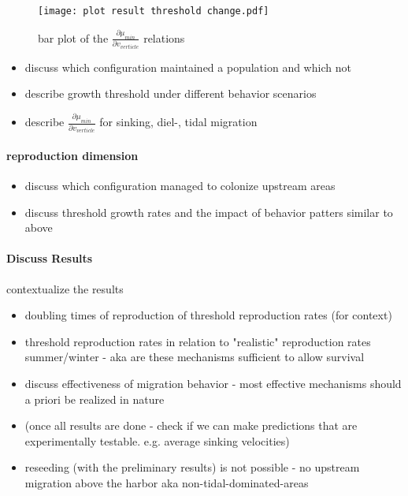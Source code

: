 \begin{figure}
    \texttt{[image: plot result threshold change.pdf]}
    \caption{bar plot of the $\frac{\partial \mu_{min}}{\partial v_{verticle}}$ relations}
    \label{fig:retention_results_dmu}
\end{figure}

\begin{itemize}
    \item discuss which configuration maintained a population and which not
    \item describe growth threshold under different behavior scenarios
    \item describe $\frac{\partial \mu_{min}}{\partial v_{verticle}}$ for sinking, diel-, tidal migration
\end{itemize}

\paragraph{reproduction dimension}
\begin{itemize}
    \item discuss which configuration managed to colonize upstream areas
    \item discuss threshold growth rates and the impact of behavior patters similar to above
\end{itemize}

\paragraph{Discuss Results}
contextualize the results 
\begin{itemize}
    \item doubling times of reproduction of threshold reproduction rates (for context)
    \item threshold reproduction rates in relation to "realistic" reproduction rates summer/winter - aka are these mechanisms sufficient to allow survival
    \item discuss effectiveness of migration behavior - most effective mechanisms should a priori be realized in nature 
    \item (once all results are done - check if we can make predictions that are experimentally testable. e.g. average sinking velocities)
    \item reseeding (with the preliminary results) is not possible - no upstream migration above the harbor aka non-tidal-dominated-areas
\end{itemize}


